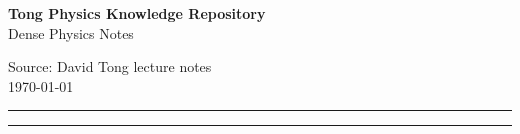 



\thispagestyle{empty}

\begin{minipage}[t]{0.58\textwidth}
\raggedright
\textbf{Tong Physics Knowledge Repository}\\
Dense Physics Notes
\end{minipage}%
\begin{minipage}[t]{0.42\textwidth}
\raggedleft
Source: David Tong lecture notes\\
\today
\end{minipage}

\vspace{0.5em}
\rule{\textwidth}{0.4pt}

\tableofcontents
\vspace{0.5em}
\rule{\textwidth}{0.4pt}

\clearpage

\clearpage

\clearpage

\clearpage

\clearpage

\clearpage

\clearpage

\clearpage

\clearpage



